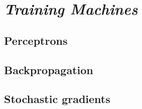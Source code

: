 \chapter{\emph{Training Machines}} 
\label{trainingmachines}

\section{Perceptrons}
\section{Backpropagation}
\section{Stochastic gradients}

